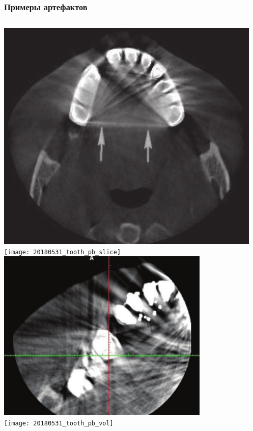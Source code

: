 
\begin{frame}
\frametitle{Примеры артефактов}

\begin{columns}[t]
\centering
\includegraphics[height=0.35\textheight]{../Dissertation/images/part2_img/tooth_artifacts_med}\\ \vspace{5pt}
\texttt{[image: 20180531\_tooth\_pb\_slice]}
\centering
\includegraphics[height=0.35\textheight]{../Dissertation/images/part2_img/tooth_artifacts_med_3}\\ \vspace{5pt}
\texttt{[image: 20180531\_tooth\_pb\_vol]}
\end{columns}

\end{frame}

